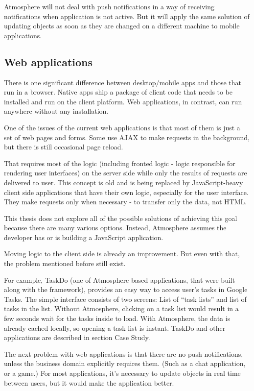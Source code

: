 Atmosphere will not deal with push notifications in a way of receiving notifications when application is not active. But it will apply the same solution of updating objects as soon as they are changed on a different machine to mobile applications. 

\subsection{Web applications}

There is one significant difference between desktop/mobile apps and those that run in a browser. Native apps ship a package of client code that needs to be installed and run on the client platform. Web applications, in contrast, can run anywhere without any installation.

One of the issues of the current web applications is that most of them is just a set of web pages and forms. Some use AJAX to make requests in the background, but there is still occasional page reload.

That requires most of the logic (including fronted logic - logic responsible for rendering user interfaces) on the server side while only the results of requests are delivered to user. This concept is old \citep{html_history} and is being replaced by JavaScript-heavy client side applications that have their own logic, especially for the user interface. They make requests only when necessary - to transfer only the data, not HTML.

This thesis does not explore all of the possible solutions of achieving this goal because there are many various options. Instead, Atmosphere assumes the developer has or is building a JavaScript application.

Moving logic to the client side is already an improvement. But even with that, the problem mentioned before still exist.

For example, TaskDo (one of Atmosphere-based applications, that were built along with the framework), provides an easy way to access user's tasks in Google Tasks. The simple interface consists of two screens: List of ``task lists'' and list of tasks in the list. Without Atmosphere, clicking on a task list would result in a few seconds wait for the tasks inside to load. With Atmosphere, the data is already cached locally, so opening a task list is instant. TaskDo and other applications are described in section Case Study.

The next problem with web applications is that there are no push notifications, unless the business domain explicitly requires them. (Such as a chat application, or a game.) For most applications, it's necessary to update objects  in real time between users, but it would make the application better.